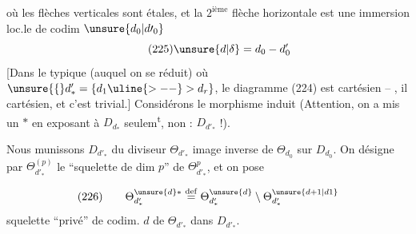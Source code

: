 où les flèches verticales sont étales,
et la $2^{\mathrm{ième}}$ flèche horizontale est une
immersion loc.le de codim $\unsure{d_0|d\prime_0}$
\[
\tag{225}\unsure{d|\delta}=d_0-d'_0
\]
[Dans le typique (auquel on se réduit)
où $\unsure{\{}d'_* = \{d_1\uline{>--} >d_r\}$, le diagramme
(224) est cartésien -- , il
  cartésien,  et c'est trivial.]
Considérons le morphisme induit
(Attention, on a mis un $*$ en exposant
à $D_{d_*}$ seulem\textsuperscript{t}, non : $D_{d'_*}$ !).

Nous munissons $D_{d'_*}$ du diviseur
$\Theta_{d'_*}$ image inverse de $\Theta_{d_0}$ sur $D_{d_0}$.
On désigne par $\Theta_{d'_*}^{(p)}$ le ``squelette
de dim $p$'' de $\Theta_{d'_*}^{p}$, et  on pose


\[
(226)\qquad
\Theta_{d'_*}^{\unsure{d}*}\overset{\mathrm{def}}=
\Theta_{d'_*}^{\unsure{d}}\setminus
\Theta_{d'_*}^{\unsure{d+1|d1}}
\]
squelette ``privé'' de codim. $d$ de
$\Theta_{d'_*}$ dans $D_{d'_*}$.

